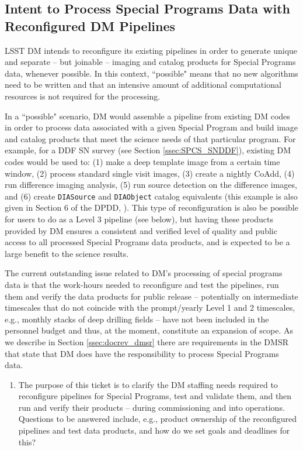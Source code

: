 \documentclass[DM,lsstdraft,toc]{lsstdoc}
\begin{document}
\subsection{Intent to Process Special Programs Data with Reconfigured DM Pipelines}\label{ssec:dmplans_reconfig}

LSST DM intends to reconfigure its existing pipelines in order to generate unique and separate -- but joinable -- imaging and catalog products for Special Programs data, whenever possible. In this context, ``possible" means that no new algorithms need to be written and that an intensive amount of additional computational resources is not required for the processing.

In a ``possible" scenario, DM would assemble a pipeline from existing DM codes in order to process data associated with a given Special Program and build image and catalog products that meet the science needs of that particular program. For example, for a DDF SN survey (see Section \ref{ssec:SPCS_SNDDF}), existing DM codes would be used to: (1) make a deep template image from a certain time window, (2) process standard single visit images, (3) create a nightly CoAdd, (4) run difference imaging analysis, (5) run source detection on the difference images, and (6) create {\tt DIASource} and {\tt DIAObject} catalog equivalents (this example is also given in Section 6 of the DPDD, \cite{LSE-163}). This type of reconfiguration is also be possible for users to do as a Level 3 pipeline (see below), but having these products provided by DM ensures a consistent and verified level of quality and public access to all processed Special Programs data products, and is expected to be a large benefit to the science results.

The current outstanding issue related to DM's processing of special programs data is that the work-hours needed to reconfigure and test the pipelines, run them and verify the data products for public release -- potentially on intermediate timescales that do not coincide with the prompt/yearly Level 1 and 2 timescales, e.g., monthly stacks of deep drilling fields -- have not been included in the personnel budget and thus, at the moment, constitute an expansion of scope. As we describe in Section \ref{ssec:docrev_dmsr} there are requirements in the DMSR that state that DM does have the responsibility to process Special Programs data.

\begin{enumerate}[resume,topsep=-10pt,after=\vspace{10pt},label= \textbf{Action \Roman*}] \item \label{reconfig-1} The purpose of this ticket is to clarify the DM staffing needs required to reconfigure pipelines for Special Programs, test and validate them, and then run and verify their products -- during commissioning and into operations. Questions to be answered include, e.g., product ownership of the reconfigured pipelines and test data products, and how do we set goals and deadlines for this? \end{enumerate}
\end{document}
